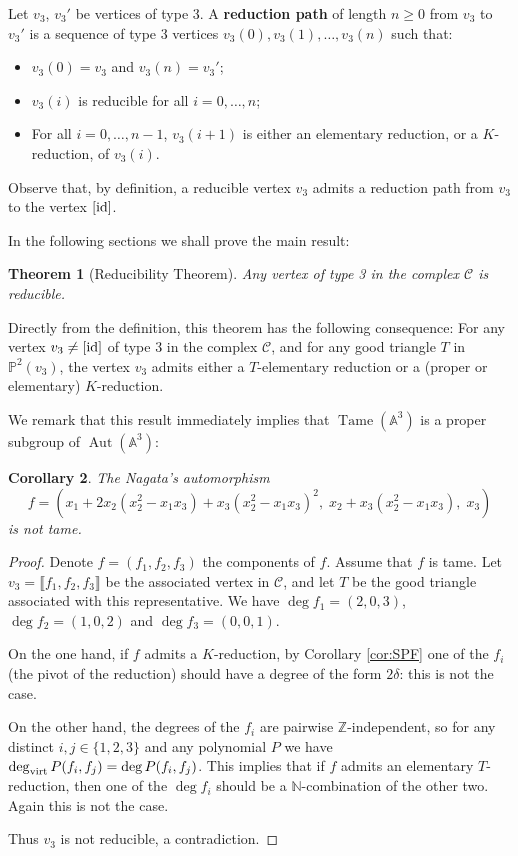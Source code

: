 \documentclass[reqno,oneside,11pt]{amsart}
\theoremstyle{plain}
\newtheorem{theorem}{Theorem}[section]
\newtheorem{corollary}[theorem]{Corollary}
\theoremstyle{definition}
\newcommand{\Z}{\mathbb{Z}}
\newcommand{\N}{\mathbb{N}}
\newcommand{\A}{{\mathbb{A}}}
\newcommand{\p}{\mathbb{P}}
\DeclareMathOperator{\Aut}{Aut}
\DeclareMathOperator{\Tame}{Tame}
\newcommand{\Comp}{\mathcal{C}}
\newcommand{\id}{\text{\rm id}}
\newcommand{\dvirt}{\deg_{\text{\rm virt}}}
\newcommand{\llb}{\llbracket}
\newcommand{\rrb}{\rrbracket}
\newcommand{\lines}[1]{\p^2(#1)}
\renewcommand{\ge}{\geqslant}
\begin{document}
Let $v_3$, $v_3'$ be vertices of type 3.
A \textbf{reduction path} of length $n \ge 0$ from $v_3$ to $v_3'$ is a sequence
of type 3 vertices $v_3(0), v_3(1), \dots, v_3(n)$ such that:
\begin{itemize}
\item $v_3(0) = v_3$ and $v_3(n) = v_3'$;
\item $v_3(i)$ is reducible for all $i = 0, \dots, n$;
\item For all $i = 0, \dots, n-1$, $v_3(i+1)$ is either an elementary reduction,
or a $K$-reduction, of $v_3(i)$.
\end{itemize}

Observe that, by definition, a reducible vertex $v_3$ admits a reduction path from $v_3$ to the vertex $[\id]$.

In the following sections we shall prove the main result:

\begin{theorem}[Reducibility Theorem] \label{thm:reducibility}
Any vertex of type 3 in the complex $\Comp$ is reducible.
\end{theorem}

Directly from the definition, this theorem has the following consequence: For
any vertex $v_3 \neq [\id]$ of type 3 in the complex $\Comp$, and for any good
triangle $T$ in $\lines{v_3}$, the vertex $v_3$ admits either a $T$-elementary
reduction  or a (proper or elementary) $K$-reduction.

We remark that this result immediately implies that $\Tame(\A^3)$ is a proper
subgroup of $\Aut(\A^3)$:

\begin{corollary} \label{cor:nagata}
The Nagata's automorphism
$$f = (x_1 + 2x_2(x_2^2 - x_1x_3) + x_3(x_2^2 - x_1x_3)^2,\; x_2 + x_3(x_2^2 -
x_1x_3),\; x_3)$$
is not tame.
\end{corollary}

\begin{proof}
Denote $f =(f_1, f_2, f_3)$ the components of $f$.
Assume that $f$ is tame.
Let $v_3 = \llb f_1, f_2, f_3 \rrb$ be the associated
vertex in $\Comp$, and let $T$ be the good triangle associated with this
representative.
We have $\deg f_1 = (2,0,3)$, $\deg f_2 = (1, 0 ,2)$ and $\deg f_3 = (0,0,1)$.

On the one hand, if $f$ admits a $K$-reduction, by Corollary \ref{cor:SPF} one
of the $f_i$ (the pivot of the reduction) should have a degree of the form
$2\delta$: this is not the case.

On the other hand, the degrees of the $f_i$ are pairwise $\Z$-independent, so
for any distinct $i,j \in \{1,2,3\}$ and any polynomial $P$ we have $\dvirt
P(f_i,f_j) = \deg P(f_i,f_j)$.
This implies that if $f$ admits an elementary $T$-reduction, then one of the
$\deg f_i$ should be a $\N$-combination of the other two. Again this is not the
case.

Thus $v_3$ is not reducible, a contradiction.
\end{proof}
\end{document}

